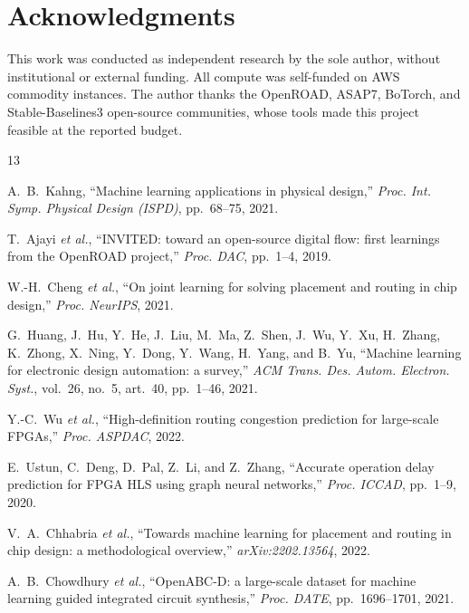 \documentclass[conference]{IEEEtran}
\begin{document}
\section*{Acknowledgments}

This work was conducted as independent research by the sole author,
without institutional or external funding. All compute was self-funded
on AWS commodity instances. The author thanks the OpenROAD, ASAP7,
BoTorch, and Stable-Baselines3 open-source communities, whose tools
made this project feasible at the reported budget.


\begin{thebibliography}{13}

A.~B.~Kahng, ``Machine learning applications in physical design,''
\textit{Proc. Int. Symp. Physical Design (ISPD)}, pp.~68--75, 2021.

T.~Ajayi \textit{et al.}, ``INVITED: toward an open-source digital flow:
first learnings from the OpenROAD project,''
\textit{Proc. DAC}, pp.~1--4, 2019.

W.-H.~Cheng \textit{et al.}, ``On joint learning for solving placement and
routing in chip design,'' \textit{Proc. NeurIPS}, 2021.

G.~Huang, J.~Hu, Y.~He, J.~Liu, M.~Ma, Z.~Shen, J.~Wu, Y.~Xu,
H.~Zhang, K.~Zhong, X.~Ning, Y.~Dong, Y.~Wang, H.~Yang, and B.~Yu,
``Machine learning for electronic design automation: a survey,''
\textit{ACM Trans. Des. Autom. Electron. Syst.},
vol.~26, no.~5, art.~40, pp.~1--46, 2021.

Y.-C.~Wu \textit{et al.}, ``High-definition routing congestion prediction
for large-scale FPGAs,'' \textit{Proc. ASPDAC}, 2022.

E.~Ustun, C.~Deng, D.~Pal, Z.~Li, and Z.~Zhang,
``Accurate operation delay prediction for FPGA HLS using graph neural
networks,'' \textit{Proc. ICCAD}, pp.~1--9, 2020.

V.~A.~Chhabria \textit{et al.}, ``Towards machine learning for placement
and routing in chip design: a methodological overview,''
\textit{arXiv:2202.13564}, 2022.

A.~B.~Chowdhury \textit{et al.}, ``OpenABC-D: a large-scale dataset for
machine learning guided integrated circuit synthesis,''
\textit{Proc. DATE}, pp.~1696--1701, 2021.


\end{thebibliography}
\end{document}
